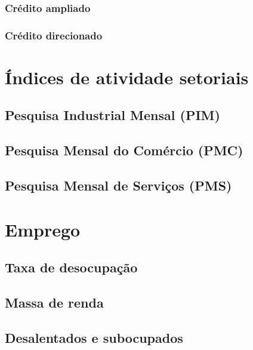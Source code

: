 \documentclass{SelfArx}
\begin{document}
\subsubsection*{Crédito ampliado}
\label{sec:org33c4a4e}

\subsubsection*{Crédito direcionado}
\label{sec:org9536363}



\section*{Índices de atividade setoriais}
\label{sec:org9b7f818}



\subsection*{Pesquisa Industrial Mensal (PIM)}
\label{sec:org0ce673f}


\subsection*{Pesquisa Mensal do Comércio (PMC)}
\label{sec:orgecd0a6d}


\subsection*{Pesquisa Mensal de Serviços (PMS)}
\label{sec:orgd1590ac}

\section*{Emprego}
\label{sec:org2834e5f}



\subsection*{Taxa de desocupação}
\label{sec:orgda53a7f}


\subsection*{Massa de renda}
\label{sec:orgb690c85}


\subsection*{Desalentados e subocupados}
\label{sec:org46cd71b}
\end{document}
